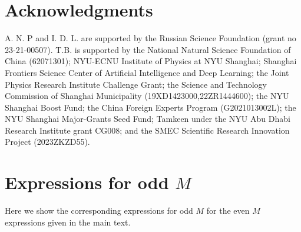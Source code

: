 \documentclass[%
  prx,%
  twocolumn,%
  preprintnumbers,%
  amsmath,%
  amssymb,%
  superscriptaddress%
]{revtex4}
\begin{document}









\section{Acknowledgments}

A. N. P and I. D. L.  are supported by the Russian Science Foundation (grant no 23-21-00507). T.B. is supported by the National Natural Science Foundation of China (62071301); NYU-ECNU Institute of Physics at NYU Shanghai; Shanghai Frontiers Science Center of Artificial Intelligence and Deep Learning; the Joint Physics Research Institute Challenge Grant; the Science and Technology Commission of Shanghai Municipality (19XD1423000,22ZR1444600); the NYU Shanghai Boost Fund; the China Foreign Experts Program (G2021013002L); the NYU Shanghai Major-Grants Seed Fund; Tamkeen under the NYU Abu Dhabi Research Institute grant CG008; and the SMEC Scientific Research Innovation Project (2023ZKZD55).


\appendix

\section{Expressions for odd $ M $}
\label{sec:oddMexpressions}

Here we show the corresponding expressions for odd $ M $ for the even $ M $ expressions given in the main text. 
\end{document}
